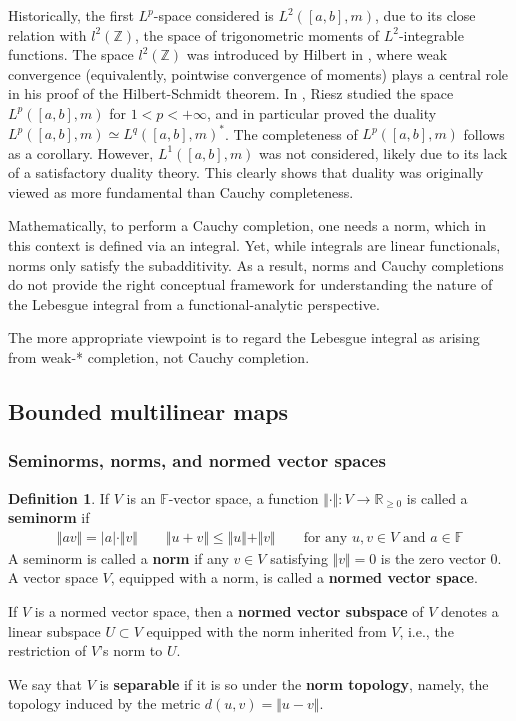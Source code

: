\documentclass[12pt,b5paper,notitlepage]{article}
\theoremstyle{definition}
\newtheorem{df}{Definition}[section]
\theoremstyle{plain}
\newcommand{\Zbb}{\mathbb Z}
\newcommand{\Rbb}{\mathbb R}
\newcommand{\Fbb}{\mathbb F}
\newcommand{\hqed}{\hfill\qedsymbol}
\numberwithin{equation}{section}
\begin{document}
Historically, the first $L^p$-space considered is $L^2([a,b],m)$, due to its close relation with $l^2(\Zbb)$, the space of trigonometric moments of $L^2$-integrable functions. The space $l^2(\Zbb)$ was introduced by Hilbert in \cite{Hil06}, where weak convergence (equivalently, pointwise convergence of moments) plays a central role in his proof of the Hilbert-Schmidt theorem. In \cite{Rie10}, Riesz studied the space $L^p([a,b],m)$ for $1<p<+\infty$, and in particular proved the duality $L^p([a,b],m)\simeq L^q([a,b],m)^*$. The completeness of $L^p([a,b],m)$ follows as a corollary. However, $L^1([a,b],m)$ was not considered, likely due to its lack of a satisfactory duality theory. This clearly shows that duality was originally viewed as more fundamental than Cauchy completeness.


Mathematically, to perform a Cauchy completion, one needs a norm, which in this context is defined via an integral. Yet, while integrals are linear functionals, norms only satisfy the subadditivity. As a result, norms and Cauchy completions do not provide the right conceptual framework for understanding the nature of the Lebesgue integral from a functional-analytic perspective.


The more appropriate viewpoint is to regard the Lebesgue integral as arising from weak-* completion, not Cauchy completion.

\normalsize


\subsection{Bounded multilinear maps}


\subsubsection{Seminorms, norms, and normed vector spaces}

\begin{df}\label{lb45}
If $V$ is an $\Fbb$-vector space, a function $\Vert\cdot\Vert:V\rightarrow\Rbb_{\geq0}$ is called a \textbf{seminorm}  if
\begin{align}\label{eq28}
\Vert av\Vert=|a|\cdot\Vert v\Vert\qquad \Vert u+v\Vert\leq\Vert u\Vert+\Vert v\Vert\qquad\text{for any $u,v\in V$ and $a\in\Fbb$}
\end{align}
A seminorm is called a \textbf{norm} if any $v\in V$ satisfying $\Vert v\Vert=0$ is the zero vector $0$. A vector space $V$, equipped with a norm, is called a \textbf{normed vector space}.

If $V$ is a normed vector space, then a \textbf{normed vector subspace}  of $V$ denotes a linear subspace $U\subset V$ equipped with the norm inherited from $V$, i.e., the restriction of $V$'s norm to $U$.  

We say that $V$ is \textbf{separable}  if it is so under the \textbf{norm topology},  namely, the topology induced by the metric $d(u,v)=\Vert u-v\Vert$. \hqed
\end{df}
\end{document}
